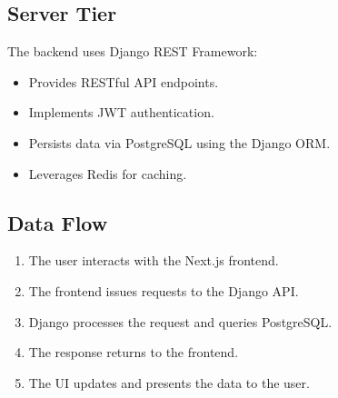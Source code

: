 \subsection{Server Tier}
The backend uses Django REST Framework:
\begin{itemize}[leftmargin=*]
	\item Provides RESTful API endpoints.
	\item Implements JWT authentication.
	\item Persists data via PostgreSQL using the Django ORM.
	\item Leverages Redis for caching.
\end{itemize}

\subsection{Data Flow}
\begin{enumerate}[leftmargin=*]
	\item The user interacts with the Next.js frontend.
	\item The frontend issues requests to the Django API.
	\item Django processes the request and queries PostgreSQL.
	\item The response returns to the frontend.
	\item The UI updates and presents the data to the user.
\end{enumerate}
